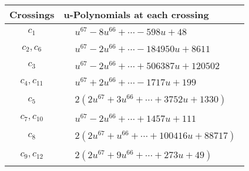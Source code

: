 \documentclass[1p]{elsarticle_modified}
\theoremstyle{definition}
\begin{document}
\begin{tabular}{m{50pt}|m{274pt}}
Crossings & \hspace{64pt}u-Polynomials at each crossing \\
\hline $$\begin{aligned}c_{1}\end{aligned}$$&$\begin{aligned}
&u^{67}-8 u^{66}+\cdots-598 u+48
\end{aligned}$\\
\hline $$\begin{aligned}c_{2},c_{6}\end{aligned}$$&$\begin{aligned}
&u^{67}-2 u^{66}+\cdots-184950 u+8611
\end{aligned}$\\
\hline $$\begin{aligned}c_{3}\end{aligned}$$&$\begin{aligned}
&u^{67}-2 u^{66}+\cdots+506387 u+120502
\end{aligned}$\\
\hline $$\begin{aligned}c_{4},c_{11}\end{aligned}$$&$\begin{aligned}
&u^{67}+2 u^{66}+\cdots-1717 u+199
\end{aligned}$\\
\hline $$\begin{aligned}c_{5}\end{aligned}$$&$\begin{aligned}
&2(2 u^{67}+3 u^{66}+\cdots+3752 u+1330)
\end{aligned}$\\
\hline $$\begin{aligned}c_{7},c_{10}\end{aligned}$$&$\begin{aligned}
&u^{67}-2 u^{66}+\cdots+1457 u+111
\end{aligned}$\\
\hline $$\begin{aligned}c_{8}\end{aligned}$$&$\begin{aligned}
&2(2 u^{67}+u^{66}+\cdots+100416 u+88717)
\end{aligned}$\\
\hline $$\begin{aligned}c_{9},c_{12}\end{aligned}$$&$\begin{aligned}
&2(2 u^{67}+9 u^{66}+\cdots+273 u+49)
\end{aligned}$\\
\hline
\end{tabular}\\~\\
\end{document}
